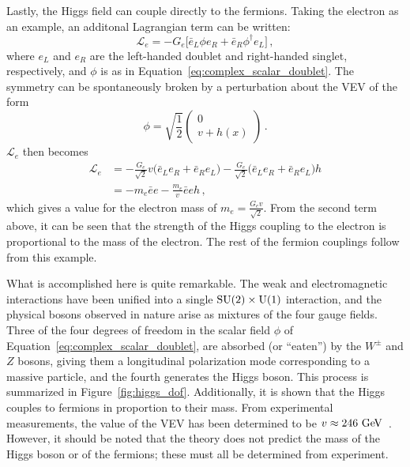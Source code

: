 Lastly, the Higgs field can couple directly to the fermions.
Taking the electron as an example, an additonal Lagrangian term can be written:
\begin{equation}
\mathcal{L}_e = -G_e \big[\bar{e}_{L}\phi e_R+\bar{e}_R\phi^{\dagger}e_L\big]\,,
\end{equation}
where $e_L$ and $e_R$ are the left-handed doublet and right-handed singlet, respectively, and $\phi$ is as in Equation~\ref{eq:complex_scalar_doublet}.
The symmetry can be spontaneously broken by a perturbation about the VEV of the form
\begin{equation}
  \phi = \sqrt{\frac{1}{2}}
  \begin{pmatrix}
  0 \\ v+h(x)
  \end{pmatrix}\,.
\end{equation}
$\mathcal{L}_e$ then becomes
\begin{equation}
  \begin{aligned}
    \mathcal{L}_e &= -\frac{G_e}{\sqrt{2}}v\big(\bar{e}_{L}e_{R}+\bar{e}_{R}e_{L}\big) - \frac{G_e}{\sqrt{2}}\big(\bar{e}_{L}e_{R}+\bar{e}_{R}e_{L}\big)h \\
                  &= -m_e\bar{e}e-\frac{m_e}{v}\bar{e}eh\,,
  \end{aligned}
\end{equation}
which gives a value for the electron mass of $m_e = \frac{G_{e}v}{\sqrt{2}}$.
From the second term above, it can be seen that the strength of the Higgs coupling to the electron is proportional to the mass of the electron.
The rest of the fermion couplings follow from this example.

What is accomplished here is quite remarkable.
The weak and electromagnetic interactions have been unified into a single $\textrm{SU}(2)\times\textrm{U}(1)$ interaction, and the physical bosons observed in nature arise as mixtures of the four gauge fields.
Three of the four degrees of freedom in the scalar field $\phi$ of Equation~\ref{eq:complex_scalar_doublet}, are absorbed (or ``eaten'') by the $W^{\pm}$ and $Z$ bosons, giving them a longitudinal polarization mode corresponding to a massive particle, and the fourth generates the Higgs boson.
This process is summarized in Figure~\ref{fig:higgs_dof}.
Additionally, it is shown that the Higgs couples to fermions in proportion to their mass.
From experimental measurements, the value of the VEV has been determined to be $v\approx 246\gev$~\cite{2014.pdg}.
However, it should be noted that the theory does not predict the mass of the Higgs boson or of the fermions; these must all be determined from experiment.

